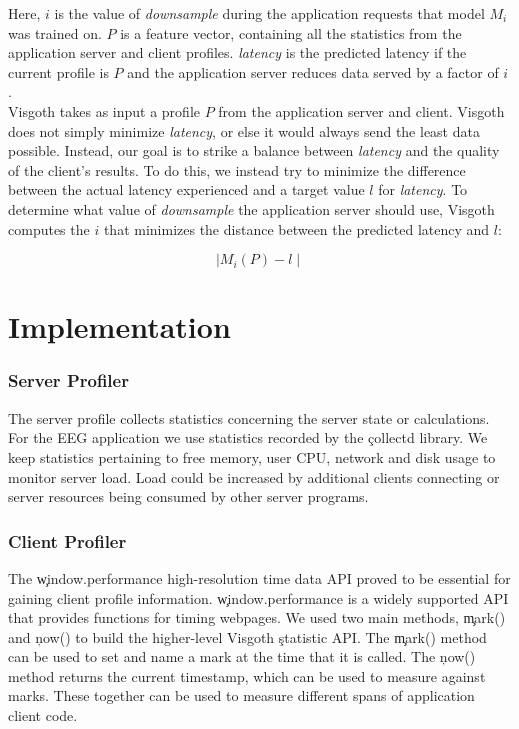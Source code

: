   Here, $i$ is the value of \emph{downsample} during the application requests
  that model $M_i$ was trained on. $P$ is a feature vector, containing all the
  statistics from the application server and client profiles. \emph{latency} is
  the predicted latency if the current profile is $P$ and the application
  server reduces data served by a factor of $i$.\\

  Visgoth takes as input a profile $P$ from the application server and client.
  Visgoth does not simply minimize \emph{latency}, or else it would always send
  the least data possible. Instead, our goal is to strike a balance between
  \emph{latency} and the quality of the client's results. To do this, we
  instead try to minimize the difference between the actual latency experienced
  and a target value $l$ for \emph{latency}. To determine what value of
  \emph{downsample} the application server should use, Visgoth computes the $i$
  that minimizes the distance between the predicted latency and $l$:

  \begin{equation*}
    \mid M_i(P) - l \mid
  \end{equation*}

\section{Implementation}\label{visgoth-ch:implementation}

  \subsubsection{Server Profiler}\label{visgoth-ch:implementation-server}

  The server profile collects statistics concerning the server state or
  calculations. For the EEG application we use statistics recorded by the
  \c{collectd} \cite{collectd} library. We keep statistics pertaining to free
  memory, user CPU, network and disk usage to monitor server load.  Load could
  be increased by additional clients connecting or server resources being
  consumed by other server programs.

  \subsubsection{Client Profiler}\label{visgoth-ch:implementation-client}

  The \c{window.performance} high-resolution time data API proved to be
  essential for gaining client profile information. \c{window.performance} is a
  widely supported API that provides functions for timing webpages. We used two
  main methods, \c{mark()} and \c{now()} to build the higher-level Visgoth
  \c{statistic} API. The \c{mark()} method can be used to set and name a mark
  at the time that it is called. The \c{now()} method returns the current
  timestamp, which can be used to measure against marks. These together can be
  used to measure different spans of application client code.


